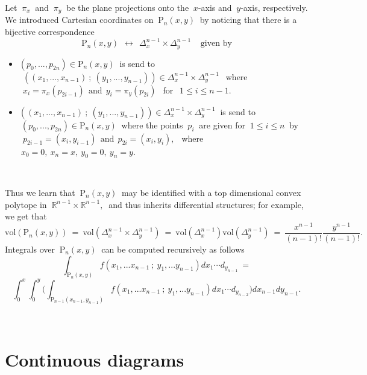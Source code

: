 \documentclass[10pt,leqeq]{article}
\begin{document}
\noindent Let $\ \pi_x \ $ and $\ \pi_y \ $ be the plane projections onto the $\ x$-axis and $\ y$-axis, respectively. We introduced Cartesian coordinates on $\ \mathrm{P}_n(x,y) \ $ by noticing that there is a bijective correspondence $$\mathrm{P}_n(x,y) \ \ \longleftrightarrow  \ \ 
\Delta^{n-1}_x \times \Delta^{n-1}_y \ \ \ \ \  \mbox{given by}$$
\begin{itemize}
  \item $ (p_0,...,p_{2n})  \in \mathrm{P}_n(x,y) \ $ is send to  $\ \ ((x_1,...,x_{n-1})\ ; \ (y_1,...,y_{n-1})) \in \Delta^{n-1}_x \times \Delta^{n-1}_y \ \ $ where
      $ \ \ x_{i}=\pi_x(p_{2i-1})  \ \  \mbox{and}  \ \ 
      y_{i}=\pi_y(p_{2i})\ \ $ for $\ \ 1\leq i \leq n-1.$
      
  \item $((x_1,...,x_{n-1})\ ; \ (y_1,...,y_{n-1})) \in \Delta^{n-1}_x \times \Delta^{n-1}_y \ $ is send to $ \ (p_0,...,p_{2n})  \in \mathrm{P}_n(x,y) \ $ where the points $\ p_i \ $ are given  for $\ 1 \leq i \leq n\ $ by
      $\ \   p_{2i-1}=(x_i,y_{i-1})  \ \  \mbox{and} \ \  p_{2i}=(x_i,y_i),\ \ $ where  $\ x_0=0, \ x_n=x,\  y_0=0, \  y_n=y. \ $
\end{itemize}

\

Thus we learn that  $\ \mathrm{P}_n(x,y) \ $ 
may be identified with a top dimensional convex polytope in 
$\ \mathbb{R}^{n-1}\times \mathbb{R}^{n-1}, \ $ and thus inherits differential structures; for example,  we get that
$$\mathrm{vol}(\mathrm{P}_n(x,y)) \ = \ \mathrm{vol}(\Delta^{n-1}_x \times \Delta^{n-1}_y)  \ = \ \mathrm{vol}(\Delta^{n-1}_x) \mathrm{vol}(\Delta^{n-1}_y)\ = \ \frac{x^{n-1}}{(n-1)!}\frac{y^{n-1}}{(n-1)!}.$$ 
Integrals over $\ \mathrm{P}_n(x,y) \ $ can be computed recursively as follows
$$\int_{\mathrm{P}_n(x,y)}f(x_1,...x_{n-1}\ ; \ y_1,...y_{n-1})dx_1\cdots d_{y_{n-1}} \ = $$
$$ \int_{0}^{x}\int_{0}^{y}\bigg( \int_{\mathrm{P}_{n-1}(x_{n-1},y_{n-1})}f(x_1,...x_{n-1}\ ; \ y_1,...y_{n-1})dx_1\cdots d_{y_{n-2}} \bigg)dx_{n-1}dy_{n-1}.$$

\

\section{Continuous diagrams}\label{s3}
\end{document}
